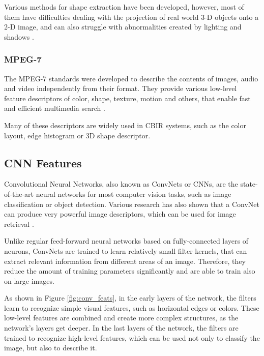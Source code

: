 \documentclass[12pt]{report}
\begin{document}
Various methods for shape extraction have been developed, however, most of them have difficulties dealing with the projection of real world 3-D objects onto a 2-D image, and can also struggle with abnormalities created by lighting and shadows \cite{zhang2004review}.

\subsubsection{MPEG-7}
The MPEG-7 standards were developed to describe the contents of images, audio and video independently from their format. They provide various low-level feature descriptors of color, shape, texture, motion and others, that enable fast and efficient multimedia search \cite{noauthor_visual_nodate}.

Many of these descriptors are widely used in CBIR systems, such as the color layout, edge histogram or 3D shape descriptor.

\pagebreak
\subsection{CNN Features}
Convolutional Neural Networks, also known as ConvNets or CNNs, are the state-of-the-art neural networks for most computer vision tasks, such as image classification or object detection. Various research has also shown that a ConvNet can produce very powerful image descriptors, which can be used for image retrieval \cite{NIPS2012_4824}\cite{razavian_cnn_2014-2}.

Unlike regular feed-forward neural networks based on fully-connected layers of neurons, ConvNets are trained to learn relatively small filter kernels, that can extract relevant information from different areas of an image. Therefore, they reduce the amount of training parameters significantly and are able to train also on large images.

As shown in Figure \ref{fig:conv_feats}, in the early layers of the network, the filters learn to recognize simple visual features, such as horizontal edges or colors. These low-level features are combined and create more complex structures, as the network's layers get deeper. In the last layers of the network, the filters are trained to recognize high-level features, which can be used not only to classify the image, but also to describe it.
\end{document}
